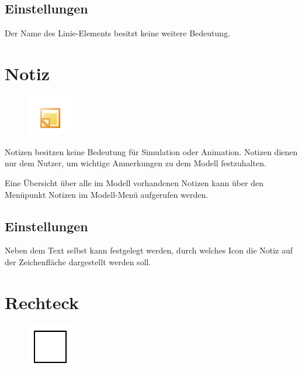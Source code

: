 \subsection*{Einstellungen}

Der Name des Linie-Elements besitzt keine weitere Bedeutung.


\section{Notiz}
\label{ref:ModelElementNote}

\begin{figure}
\vspace{-22pt}
\includegraphics[width=2cm]{imageModelElementNote.png}
\vspace{-22pt}
\end{figure}

Notizen besitzen keine Bedeutung für Simulation oder Animation.
Notizen dienen nur dem Nutzer, um wichtige Anmerkungen zu dem Modell festzuhalten.

Eine Übersicht über alle im Modell vorhandenen Notizen kann über
den Menüpunkt Notizen im Modell-Menü
aufgerufen werden.

\subsection*{Einstellungen}

Neben dem Text selbst kann festgelegt werden, durch welches Icon die
Notiz auf der Zeichenfläche dargestellt werden soll.


\section{Rechteck}
\label{ref:ModelElementRectangle}

\begin{figure}
\vspace{-22pt}
\includegraphics[width=2cm]{imageModelElementRectangle.png}
\vspace{-22pt}
\end{figure}

